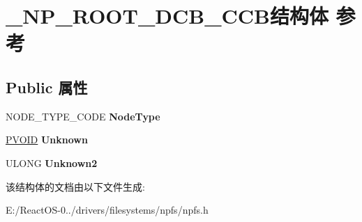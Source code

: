 \hypertarget{struct___n_p___r_o_o_t___d_c_b___c_c_b}{}\section{\+\_\+\+N\+P\+\_\+\+R\+O\+O\+T\+\_\+\+D\+C\+B\+\_\+\+C\+C\+B结构体 参考}
\label{struct___n_p___r_o_o_t___d_c_b___c_c_b}
\subsection*{Public 属性}
\begin{DoxyCompactItemize}
\item 
\mbox{\label{struct___n_p___r_o_o_t___d_c_b___c_c_b_a3313bedb4a58e09a647aaeda4c611633}} 
N\+O\+D\+E\+\_\+\+T\+Y\+P\+E\+\_\+\+C\+O\+DE {\bfseries Node\+Type}
\item 
\mbox{\label{struct___n_p___r_o_o_t___d_c_b___c_c_b_a3bf022557ffa8b908b22195f24b778ff}} 
\hyperlink{interfacevoid}{P\+V\+O\+ID} {\bfseries Unknown}
\item 
\mbox{\label{struct___n_p___r_o_o_t___d_c_b___c_c_b_adfe59b257dcff42247b27a7c61007376}} 
U\+L\+O\+NG {\bfseries Unknown2}
\end{DoxyCompactItemize}


该结构体的文档由以下文件生成\+:\begin{DoxyCompactItemize}
\item 
E\+:/\+React\+O\+S-\/0../drivers/filesystems/npfs/npfs.\+h\end{DoxyCompactItemize}

